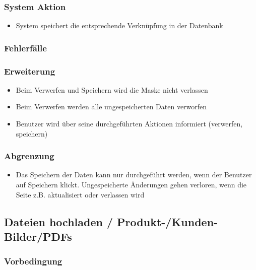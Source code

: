 \documentclass[a4paper,12pt]{article}
\begin{document}
\subsubsection{System Aktion}\label{system-aktion-10}

\begin{itemize}

\item
  System speichert die entsprechende Verknüpfung in der Datenbank
\end{itemize}

\subsubsection{Fehlerfälle}\label{fehlerfalle-10}

\subsubsection{Erweiterung}\label{erweiterung-10}

\begin{itemize}

\item
  Beim Verwerfen und Speichern wird die Maske nicht verlassen
\item
  Beim Verwerfen werden alle ungespeicherten Daten verworfen
\item
  Benutzer wird über seine durchgeführten Aktionen informiert
  (verwerfen, speichern)
\end{itemize}

\subsubsection{Abgrenzung}\label{abgrenzung-10}

\begin{itemize}

\item
  Das Speichern der Daten kann nur durchgeführt werden, wenn der
  Benutzer auf Speichern klickt. Ungespeicherte Änderungen gehen
  verloren, wenn die Seite z.B. aktualisiert oder verlassen wird
\end{itemize}

\subsection{Dateien hochladen / Produkt-/Kunden- Bilder/PDFs}\label{dateien-hochladen-produkt-kunden--bilderpdfs}

\subsubsection{Vorbedingung}\label{vorbedingung-11}
\end{document}
